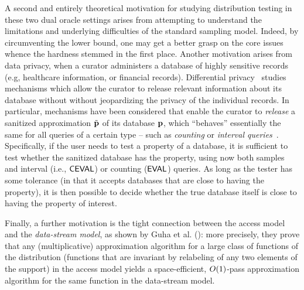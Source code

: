   A second and entirely theoretical motivation for studying distribution testing in these two dual oracle settings arises from attempting to understand the limitations and underlying difficulties of the standard sampling model. Indeed, by circumventing the lower bound, one may get a better grasp on the core issues whence the hardness stemmed in the first place.  
  Another motivation arises from data privacy, when a curator administers a database of highly sensitive records (e.g, healthcare information, or financial records). 
  Differential privacy~\cite{DN:03,DN:04,Dwork:08} studies mechanisms which allow the curator to release relevant information about its database without without jeopardizing the privacy of the individual records.
  In particular, mechanisms have been considered that enable the curator to \emph{release} a sanitized approximation $\tilde{\mathbf{p}}$ of its database $\mathbf{p}$, which ``behaves'' essentially the same for all queries of a certain type -- such as \emph{counting} or \emph{interval queries}~\cite{BLR:13}.\footnotemark{}
   Specifically, if the user needs to test a property of a database, it is sufficient to test whether the sanitized database has the property, using now both samples and interval (i.e., ${\sf CEVAL}$) or counting (${\sf EVAL}$) queries. As long as the tester has some tolerance (in that it accepts databases that are close to having the property), it is then possible to decide whether the true database itself is close to having the property of interest.   
     
  Finally, a further motivation is the tight connection between the \pdfsamp access model and the \emph{data-stream model}, as shown by Guha et al. (\cite[Theorem 25]{GMV:06}): more precisely, they prove that any (multiplicative) approximation algorithm for a large class of functions of the distribution (functions that are invariant by relabeling of any two elements of the support) in the \pdfsamp access model yields a space-efficient, $\bigO{1}$-pass approximation algorithm for the same function in the data-stream model.

